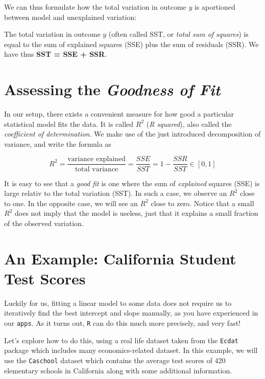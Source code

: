 \documentclass[]{book}
\newenvironment{tip}{\begin{tcolorbox}[colback=green!5!white,colframe=green,title=\textbf{Tip:}]}{\end{tcolorbox}}
\theoremstyle{definition}
\theoremstyle{definition}
\theoremstyle{definition}
\theoremstyle{remark}
\begin{document}
We can thus formulate how the total variation in outcome \(y\) is
aportioned between model and unexplained variation:

\begin{tip}
The total variation in outcome \(y\) (often called SST, or \emph{total
sum of squares}) is equal to the sum of explained squares (SSE) plus the
sum of residuals (SSR). We have thus \textbf{SST = SSE + SSR}.
\end{tip}

\section{\texorpdfstring{Assessing the \emph{Goodness of
Fit}}{Assessing the Goodness of Fit}}\label{assessing-the-goodness-of-fit}

In our setup, there exists a convenient measure for how good a
particular statistical model fits the data. It is called \(R^2\)
(\emph{R squared}), also called the \emph{coefficient of determination}.
We make use of the just introduced decomposition of variance, and write
the formula as

\[
R^2 = \frac{\text{variance explained}}{\text{total variance}} = \frac{SSE}{SST} = 1 - \frac{SSR}{SST}\in[0,1]  \label{eq:Rsquared}
\]

It is easy to see that a \emph{good fit} is one where the sum of
\emph{explained} squares (SSE) is large relativ to the total variation
(SST). In such a case, we observe an \(R^2\) close to one. In the
opposite case, we will see an \(R^2\) close to zero. Notice that a small
\(R^2\) does not imply that the model is useless, just that it explains
a small fraction of the observed variation.

\section{An Example: California Student Test Scores}\label{lm-example1}

Luckily for us, fitting a linear model to some data does not require us
to iteratively find the best intercept and slope manually, as you have
experienced in our \texttt{apps}. As it turns out, \texttt{R} can do
this much more precisely, and very fast!

Let's explore how to do this, using a real life dataset taken from the
\texttt{Ecdat} package which includes many economics-related dataset. In
this example, we will use the \texttt{Caschool} dataset which contains
the average test scores of 420 elementary schools in California along
with some additional information.
\end{document}

